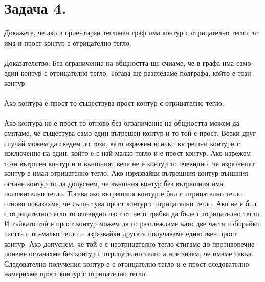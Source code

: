 \documentclass[14pt]{extarticle}
\begin{document}
\section*{Задача 4.}
Докажете, че ако в ориентиран тегловен граф има контур с отрицателно тегло, то има и прост контур с отрицателно тегло. \\\\
Доказателство:
Без ограничение на общността ще счиаме, че в графа има само един контур с отрицателно тегло. Тогава ще разгледаме подграфа, който е този контур. \\\\
Ако контура е прост то съществува прост контур с отрицателно тегло. \\\\
Ако контура не е прост то отново без ограничение на общността можем да смятаме, че същестува само един вътрешен контур и то той е прост. Всеки друг случай можем да сведем до този, като изрежем всички вътрешни контури с изключение на един, който е с най-малко тегло и е прост контур.
Ако изрежем този вътршен контур и и външният вече не е контур то очевидно, че изрязаният контур е имал отрицателно тегло.
Ако изрязвайки вътрешния контур външния остане контур то да допуснем, че външния контур без вътрешния има положително тегло.
Тогава ако вътрешния контур е бил с отрицателно тегло отново показахме, че същестува прост контур с отрицателно тегло.
Ако не е бил с отрицателно тегло то очевидно част от него трябва да бъде с отрицателно тегло. И тъйкато той е прост контур можем да го разглеждаме като две части избирайки частта с по-малко тегло и изрязвайки другата получаваме единствен прост контур.
Ако допуснем, че той е с неотрицателно тегло стигаме до противоречие понеже останахме без контур с отрицателно телго а ние знаем, че имаме такъв. Следователно получения контур е с отрицателно тегло и е прост следователно намерихме прост контур с отрицателно тегло.
\end{document}

